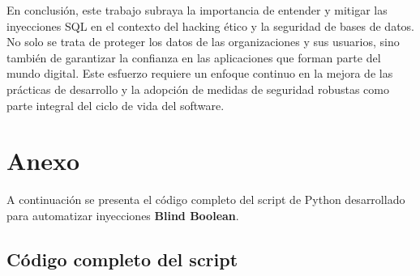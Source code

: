 \documentclass[a4paper,12pt]{article}
\begin{document}
\vspace{0,5cm}

En conclusión, este trabajo subraya la importancia de entender y mitigar las inyecciones SQL en el contexto del hacking ético y la seguridad de bases de datos. No solo se trata de proteger los datos de las organizaciones y sus usuarios, sino también de garantizar la confianza en las aplicaciones que forman parte del mundo digital. Este esfuerzo requiere un enfoque continuo en la mejora de las prácticas de desarrollo y la adopción de medidas de seguridad robustas como parte integral del ciclo de vida del software.



\section{Anexo}
\label{sec:anexo}
A continuación se presenta el código completo del script de Python desarrollado para automatizar inyecciones \textbf{Blind Boolean}.

\subsection{Código completo del script}
\end{document}
